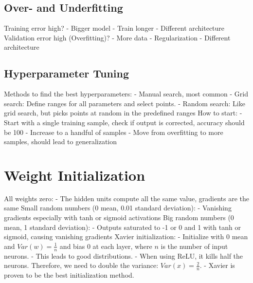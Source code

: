 \documentclass{scrartcl}
\begin{document}
\subsection*{Over- and Underfitting}
Training error high?
- Bigger model
- Train longer
- Different architecture
Validation error high (Overfitting)?
- More data
- Regularization
- Different architecture

\subsection*{Hyperparameter Tuning}
Methods to find the best hyperparameters:
- Manual search, most common
- Grid search: Define ranges for all parameters and select points.
- Random search: Like grid search, but picks points at random in the predefined ranges
How to start:
- Start with a single training sample, check if output is corrected, accuracy should be 100%
- Increase to a handful of samples
- Move from overfitting to more samples, should lead to generalization


\section*{Weight Initialization}
All weights zero:
- The hidden units compute all the same value, gradients are the same
Small random numbers (0 mean, 0.01 standard deviation):
- Vanishing gradients especially with tanh or sigmoid activations
Big random numbers (0 mean, 1 standard deviation):
- Outputs saturated to -1 or 0 and 1 with tanh or sigmoid, causing vanishing gradients
Xavier initialization:
- Initialize with 0 mean and $Var(w) = \frac{1}{n}$ and bias 0 at each layer, where $n$ is the number of input neurons.
- This leads to good distributions.
- When using ReLU, it kills half the neurons. Therefore, we need to double the variance: $Var(x) = \frac{2}{n}$.
- Xavier is proven to be the best initialization method.
\end{document}
